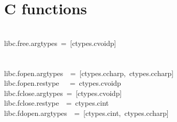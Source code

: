 \documentclass{article}\usepackage[]{graphicx}\usepackage[dvipsnames,table]{xcolor}
\makeatletter
\newcommand{\hlopt}[1]{\textcolor[rgb]{0,0,0}{#1}}%
\newcommand{\hldef}[1]{\textcolor[rgb]{0.345,0.345,0.345}{#1}}%
\newenvironment{kframe}{%
 \def\at@end@of@kframe{}%
 \ifinner\ifhmode%
  \def\at@end@of@kframe{\end{minipage}}%
  \begin{minipage}{\columnwidth}%
 \fi\fi%
 \def\FrameCommand##1{\hskip\@totalleftmargin \hskip-\fboxsep
 \colorbox{shadecolor}{##1}\hskip-\fboxsep
     \hskip-\linewidth \hskip-\@totalleftmargin \hskip\columnwidth}%
 \MakeFramed {\advance\hsize-\width
   \@totalleftmargin\z@ \linewidth\hsize
   \@setminipage}}%
 {\par\unskip\endMakeFramed%
 \at@end@of@kframe}
\newenvironment{knitrout}{}{} %
\makeatother
\begin{document}
\section{C functions}
\begin{center}
\begin{minipage}[m]{15cm}
\begin{knitrout}\small
{}\color{fgcolor}\begin{kframe}
\noindent
\ttfamily
\hldef{}\hspace*{\fill}\\
\hldef{\textunderscore libc}\hlopt{.}\hldef{free}\hlopt{.}\hldef{argtypes\ }\hlopt{=\ {[}}\hldef{ctypes}\hlopt{.}\hldef{c\textunderscore void\textunderscore p}\hlopt{{]}}\hspace*{\fill}\\
\hldef{}\hspace*{\fill}\\
\hldef{}\hspace*{\fill}\\
\hldef{\textunderscore libc}\hlopt{.}\hldef{fopen}\hlopt{.}\hldef{argtypes}\hldef{\ \ }\hldef{}\hlopt{=\ {[}}\hldef{ctypes}\hlopt{.}\hldef{c\textunderscore char\textunderscore p}\hlopt{,\ }\hldef{ctypes}\hlopt{.}\hldef{c\textunderscore char\textunderscore p}\hlopt{{]}}\hspace*{\fill}\\
\hldef{\textunderscore libc}\hlopt{.}\hldef{fopen}\hlopt{.}\hldef{restype}\hldef{\ \ \ }\hldef{}\hlopt{=\ }\hldef{ctypes}\hlopt{.}\hldef{c\textunderscore void\textunderscore p}\hspace*{\fill}\\
\hldef{\textunderscore libc}\hlopt{.}\hldef{fclose}\hlopt{.}\hldef{argtypes\ }\hlopt{=\ {[}}\hldef{ctypes}\hlopt{.}\hldef{c\textunderscore void\textunderscore p}\hlopt{{]}}\hspace*{\fill}\\
\hldef{\textunderscore libc}\hlopt{.}\hldef{fclose}\hlopt{.}\hldef{restype}\hldef{\ \ }\hldef{}\hlopt{=\ }\hldef{ctypes}\hlopt{.}\hldef{c\textunderscore int}\hspace*{\fill}\\
\hldef{\textunderscore libc}\hlopt{.}\hldef{fdopen}\hlopt{.}\hldef{argtypes}\hldef{\ \ }\hldef{}\hlopt{=\ {[}}\hldef{ctypes}\hlopt{.}\hldef{c\textunderscore int}\hlopt{,\ }\hldef{ctypes}\hlopt{.}\hldef{c\textunderscore char\textunderscore p}\hlopt{{]}}\hspace*{\fill}\\

\end{kframe}
\end{knitrout}
\end{minipage}
\end{center}
\end{document}
